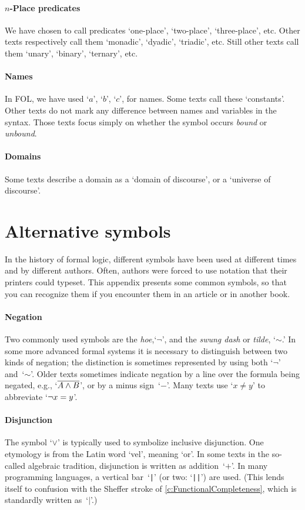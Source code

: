 \paragraph{$n$-Place predicates} We have chosen to call predicates `one-place', `two-place', `three-place', etc. Other texts respectively call them `monadic', `dyadic', `triadic', etc. Still other texts call them `unary', `binary', `ternary', etc.

\paragraph{Names} In FOL, we have used `$a$', `$b$', `$c$', for names. Some texts call these `constants'. Other texts do not mark any difference between names and variables in the syntax. Those texts focus simply on  whether the symbol occurs \emph{bound} or \emph{unbound}.

\paragraph{Domains} Some texts describe a domain as a `domain of discourse', or a `universe of discourse'.

\section{Alternative symbols}
In the history of formal logic, different symbols have been used at different times and by different authors. Often, authors were forced to use notation that their printers could typeset. This appendix presents some common symbols, so that you can recognize them if you encounter them in an article or in another book.

\paragraph{Negation} Two commonly used symbols are the
\emph{hoe},`$\neg$', and the \emph{swung dash} or \emph{tilde},
`${\sim}$.' In some more advanced formal systems it is necessary to
distinguish between two kinds of negation; the distinction is
sometimes represented by using both `$\neg$' and~`${\sim}$'. Older
texts sometimes indicate negation by a line over the formula being
negated, e.g., `$\overline{A \wedge B}$', or by a minus sign~`$-$'.
Many texts use `$x \neq y$' to abbreviate `$\neg x = y$'.

\paragraph{Disjunction} The symbol `$\vee$' is typically used to
symbolize inclusive disjunction. One etymology is from the Latin word
`vel', meaning `or'. In some texts in the so-called algebraic
tradition, disjunction is written as addition~`$+$'. In many
programming languages, a vertical bar~`\verb+|+' (or two: `\verb+||+')
are used. (This lends itself to confusion with the Sheffer stroke of
\cref{c:FunctionalCompleteness}, which is standardly written
as~`$\mid$'.)

